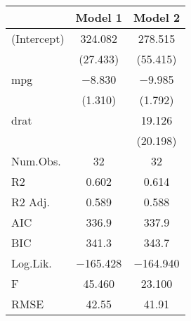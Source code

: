 \begin{table}
\centering
\begin{tabular}[t]{lcc}
\toprule
  & Model 1 & Model 2\\
\midrule
(Intercept) & \num{324.082} & \num{278.515}\\
 & (\num{27.433}) & (\num{55.415})\\
mpg & \num{-8.830} & \num{-9.985}\\
 & (\num{1.310}) & (\num{1.792})\\
drat &  & \num{19.126}\\
 &  & (\num{20.198})\\
\midrule
Num.Obs. & \num{32} & \num{32}\\
R2 & \num{0.602} & \num{0.614}\\
R2 Adj. & \num{0.589} & \num{0.588}\\
AIC & \num{336.9} & \num{337.9}\\
BIC & \num{341.3} & \num{343.7}\\
Log.Lik. & \num{-165.428} & \num{-164.940}\\
F & \num{45.460} & \num{23.100}\\
RMSE & \num{42.55} & \num{41.91}\\
\bottomrule
\end{tabular}
\end{table}

